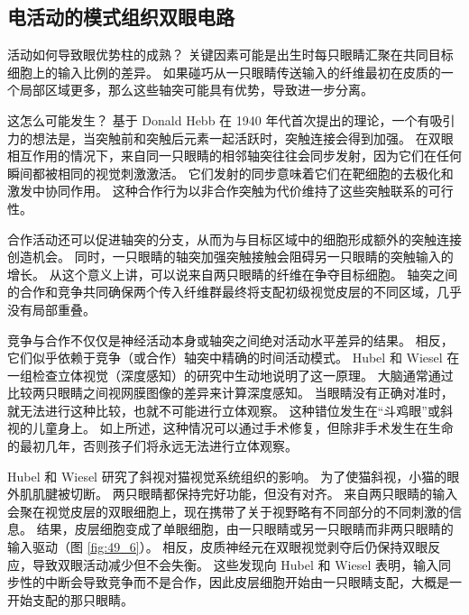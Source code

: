 \subsection{电活动的模式组织双眼电路}
活动如何导致眼优势柱的成熟？ 关键因素可能是出生时每只眼睛汇聚在共同目标细胞上的输入比例的差异。 如果碰巧从一只眼睛传送输入的纤维最初在皮质的一个局部区域更多，那么这些轴突可能具有优势，导致进一步分离。

这怎么可能发生？ 基于 Donald Hebb 在 1940 年代首次提出的理论，一个有吸引力的想法是，当突触前和突触后元素一起活跃时，突触连接会得到加强。 在双眼相互作用的情况下，来自同一只眼睛的相邻轴突往往会同步发射，因为它们在任何瞬间都被相同的视觉刺激激活。 它们发射的同步意味着它们在靶细胞的去极化和激发中协同作用。 这种合作行为以非合作突触为代价维持了这些突触联系的可行性。

合作活动还可以促进轴突的分支，从而为与目标区域中的细胞形成额外的突触连接创造机会。 同时，一只眼睛的轴突加强突触接触会阻碍另一只眼睛的突触输入的增长。 从这个意义上讲，可以说来自两只眼睛的纤维在争夺目标细胞。 轴突之间的合作和竞争共同确保两个传入纤维群最终将支配初级视觉皮层的不同区域，几乎没有局部重叠。

竞争与合作不仅仅是神经活动本身或轴突之间绝对活动水平差异的结果。 相反，它们似乎依赖于竞争（或合作）轴突中精确的时间活动模式。 Hubel 和 Wiesel 在一组检查立体视觉（深度感知）的研究中生动地说明了这一原理。 大脑通常通过比较两只眼睛之间视网膜图像的差异来计算深度感知。 当眼睛没有正确对准时，就无法进行这种比较，也就不可能进行立体观察。 这种错位发生在“斗鸡眼”或斜视的儿童身上。 如上所述，这种情况可以通过手术修复，但除非手术发生在生命的最初几年，否则孩子们将永远无法进行立体观察。

Hubel 和 Wiesel 研究了斜视对猫视觉系统组织的影响。 为了使猫斜视，小猫的眼外肌肌腱被切断。 两只眼睛都保持完好功能，但没有对齐。 来自两只眼睛的输入会聚在视觉皮层的双眼细胞上，现在携带了关于视野略有不同部分的不同刺激的信息。 
结果，皮层细胞变成了单眼细胞，由一只眼睛或另一只眼睛而非两只眼睛的输入驱动（图 \ref{fig:49_6}）。 
相反，皮质神经元在双眼视觉剥夺后仍保持双眼反应，导致双眼活动减少但不会失衡。 这些发现向 Hubel 和 Wiesel 表明，输入同步性的中断会导致竞争而不是合作，因此皮层细胞开始由一只眼睛支配，大概是一开始支配的那只眼睛。

